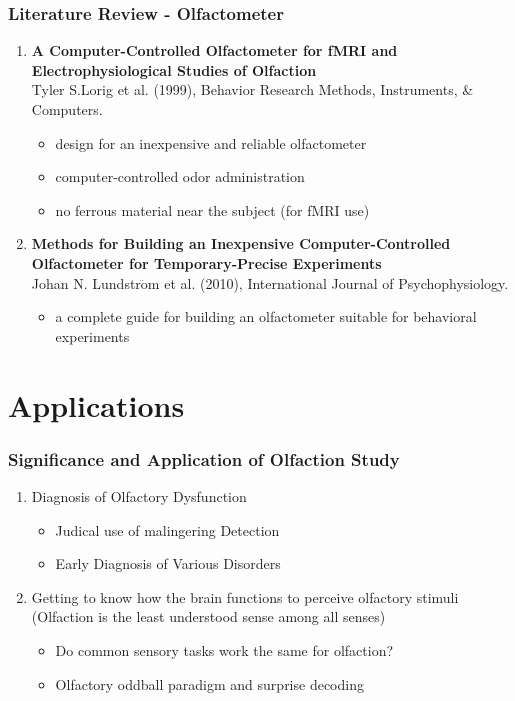 \documentclass{beamer}
\newcounter{saveenumi}
\newcommand{\conti}{\setcounter{enumi}{\value{saveenumi}}}
\begin{document}
\begin{frame}
\frametitle{Literature Review - Olfactometer}
\begin{enumerate}
	\conti
	\item \textrm{\textbf{A Computer-Controlled Olfactometer for fMRI and Electrophysiological Studies of Olfaction}}
	\\
	Tyler S.Lorig et al. (1999), Behavior Research Methods, Instruments, \& Computers.
	\begin{itemize}
		\item
		design for an inexpensive and reliable olfactometer
		\item
		computer-controlled odor administration
		\item
		no ferrous material near the subject (for fMRI use)
	\end{itemize}
	\item \textrm{\textbf{Methods for Building an Inexpensive Computer-Controlled Olfactometer for Temporary-Precise Experiments}}
	\\
	Johan N. Lundstr$\ddot{\textrm{o}}$m et al. (2010), International Journal of Psychophysiology.
	\begin{itemize}
		\item
		a complete guide for building an olfactometer suitable for behavioral experiments
	\end{itemize}
	
\end{enumerate}
\end{frame}



\section{Applications} 
\begin{frame}
	\frametitle{Significance and Application of Olfaction Study}
	\begin{enumerate}
		\item
		Diagnosis of Olfactory Dysfunction
		\begin{itemize}
			\item
			Judical use of malingering Detection
			\item 
			Early Diagnosis of Various Disorders
		\end{itemize}
		\vspace{0.5cm}
		\item
		Getting to know how the brain functions to perceive olfactory stimuli (Olfaction is the least understood sense among all senses)
		\begin{itemize}
			\item
			Do common sensory tasks work the same for olfaction?
			\item 
			Olfactory oddball paradigm and surprise decoding
		\end{itemize}
		
		
		
	\end{enumerate}
\end{frame}
\end{document}
